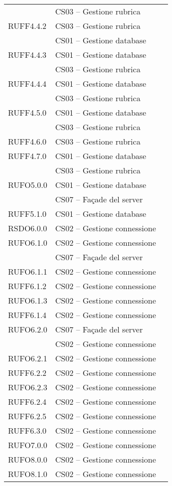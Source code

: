 \begin{center}
\begin{longtable}{lp{}l}
 & CS03 -- Gestione rubrica \\
RUFF4.4.2 & CS03 -- Gestione rubrica \\
 & CS01 -- Gestione database \\
RUFF4.4.3 & CS01 -- Gestione database \\
 & CS03 -- Gestione rubrica \\
RUFF4.4.4 & CS01 -- Gestione database \\
 & CS03 -- Gestione rubrica \\
RUFF4.5.0 & CS01 -- Gestione database \\
 & CS03 -- Gestione rubrica \\
RUFF4.6.0 & CS03 -- Gestione rubrica \\
RUFF4.7.0 & CS01 -- Gestione database \\
 & CS03 -- Gestione rubrica \\
RUFO5.0.0 & CS01 -- Gestione database \\
 & CS07 -- Façade del server \\
RUFF5.1.0 & CS01 -- Gestione database \\
RSDO6.0.0 & CS02 -- Gestione connessione \\
RUFO6.1.0 & CS02 -- Gestione connessione \\
 & CS07 -- Façade del server \\
RUFO6.1.1 & CS02 -- Gestione connessione \\
RUFF6.1.2 & CS02 -- Gestione connessione \\
RUFO6.1.3 & CS02 -- Gestione connessione \\
RUFF6.1.4 & CS02 -- Gestione connessione \\
RUFO6.2.0 & CS07 -- Façade del server \\
 & CS02 -- Gestione connessione \\
RUFO6.2.1 & CS02 -- Gestione connessione \\
RUFF6.2.2 & CS02 -- Gestione connessione \\
RUFO6.2.3 & CS02 -- Gestione connessione \\
RUFF6.2.4 & CS02 -- Gestione connessione \\
RUFF6.2.5 & CS02 -- Gestione connessione \\
RUFF6.3.0 & CS02 -- Gestione connessione \\
RUFO7.0.0 & CS02 -- Gestione connessione \\
RUFO8.0.0 & CS02 -- Gestione connessione \\
RUFO8.1.0 & CS02 -- Gestione connessione \\

\end{longtable}
\end{center}

